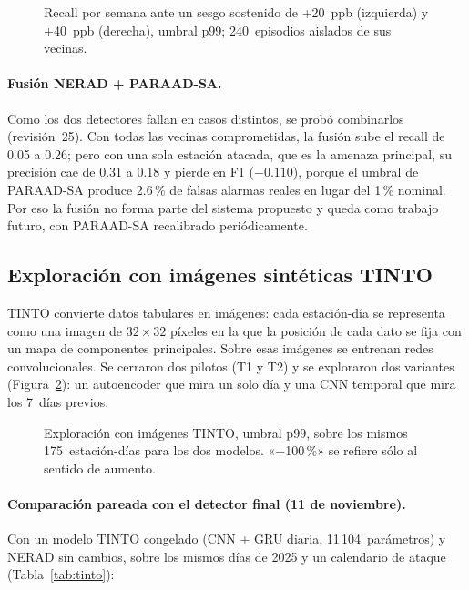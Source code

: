 \documentclass[11pt, letterpaper]{article}
\newcommand{\figurapresentacion}[1]{%
  \adjustbox{max width=\linewidth}{}}
\begin{document}
\begin{figure}[H]
  \centering
  \figurapresentacion{sesgo_sostenido}
  \caption{Recall por semana ante un sesgo sostenido de +20~ppb (izquierda) y +40~ppb
    (derecha), umbral p99; 240~episodios aislados de sus vecinas.}
  \label{fig:sesgo}
\end{figure}

\paragraph{Fusión NERAD + PARAAD-SA.} Como los dos detectores fallan en casos distintos,
se probó combinarlos (revisión~25). Con todas las vecinas comprometidas, la fusión sube el
recall de 0.05 a 0.26; pero con una sola estación atacada, que es la amenaza principal,
su precisión cae de 0.31 a 0.18 y pierde en F1 ($-0.110$), porque el umbral de PARAAD-SA
produce 2.6\,\% de falsas alarmas reales en lugar del 1\,\% nominal. Por eso la fusión no
forma parte del sistema propuesto y queda como trabajo futuro, con PARAAD-SA recalibrado
periódicamente.

\subsection{Exploración con imágenes sintéticas TINTO}
\label{sec:tinto}

TINTO convierte datos tabulares en imágenes: cada estación-día se representa como una
imagen de $32\times32$ píxeles en la que la posición de cada dato se fija con un mapa de
componentes principales. Sobre esas imágenes se entrenan redes convolucionales. Se
cerraron dos pilotos (T1 y T2) y se exploraron dos variantes (Figura~\ref{fig:tinto}):
un autoencoder que mira un solo día y una CNN temporal que mira los 7~días previos.

\begin{figure}[H]
  \centering
  \figurapresentacion{tinto}
  \caption{Exploración con imágenes TINTO, umbral p99, sobre los mismos 175~estación-días
    para los dos modelos. «+100\,\%» se refiere sólo al sentido de aumento.}
  \label{fig:tinto}
\end{figure}

\paragraph{Comparación pareada con el detector final (11 de noviembre).} Con un modelo
TINTO congelado (CNN + GRU diaria, 11\,104~parámetros) y NERAD sin cambios, sobre los
mismos días de 2025 y un calendario de ataque (Tabla~\ref{tab:tinto}):
\end{document}
